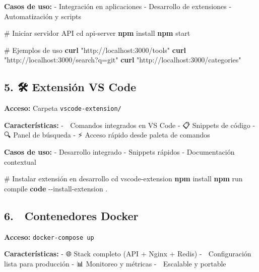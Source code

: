 \documentclass[
  11pt,
  letterpaper,
  oneside,
  openany]{scrbook}
\newenvironment{Shaded}{}{}
\newcommand{\AttributeTok}[1]{\textcolor[rgb]{0.84,0.23,0.29}{#1}}
\newcommand{\BuiltInTok}[1]{\textcolor[rgb]{0.84,0.23,0.29}{#1}}
\newcommand{\CommentTok}[1]{\textcolor[rgb]{0.42,0.45,0.49}{#1}}
\newcommand{\ExtensionTok}[1]{\textcolor[rgb]{0.84,0.23,0.29}{\textbf{#1}}}
\newcommand{\NormalTok}[1]{\textcolor[rgb]{0.14,0.16,0.18}{#1}}
\newcommand{\StringTok}[1]{\textcolor[rgb]{0.01,0.18,0.38}{#1}}
\begin{document}
\textbf{Casos de uso:} - Integración en aplicaciones - Desarrollo de
extensiones - Automatización y scripts

\begin{Shaded}
\begin{Highlighting}[]
\CommentTok{\# Iniciar servidor API}
\BuiltInTok{cd}\NormalTok{ api{-}server}
\ExtensionTok{npm}\NormalTok{ install}
\ExtensionTok{npm}\NormalTok{ start}

\CommentTok{\# Ejemplos de uso}
\ExtensionTok{curl} \StringTok{"http://localhost:3000/tools"}
\ExtensionTok{curl} \StringTok{"http://localhost:3000/search?q=git"}
\ExtensionTok{curl} \StringTok{"http://localhost:3000/categories"}
\end{Highlighting}
\end{Shaded}

\subsection{5. 🛠️ Extensión VS Code}\label{extensiuxf3n-vs-code}

\textbf{Acceso:} Carpeta \texttt{vscode-extension/}

\textbf{Características:} - 🎯 Comandos integrados en VS Code - 📋
Snippets de código - 🔍 Panel de búsqueda - ⚡ Acceso rápido desde
paleta de comandos

\textbf{Casos de uso:} - Desarrollo integrado - Snippets rápidos -
Documentación contextual

\begin{Shaded}
\begin{Highlighting}[]
\CommentTok{\# Instalar extensión en desarrollo}
\BuiltInTok{cd}\NormalTok{ vscode{-}extension}
\ExtensionTok{npm}\NormalTok{ install}
\ExtensionTok{npm}\NormalTok{ run compile}
\ExtensionTok{code} \AttributeTok{{-}{-}install{-}extension}\NormalTok{ .}
\end{Highlighting}
\end{Shaded}

\subsection{6. 🐳 Contenedores Docker}\label{contenedores-docker}

\textbf{Acceso:} \texttt{docker-compose\ up}

\textbf{Características:} - 🌐 Stack completo (API + Nginx + Redis) - 🔧
Configuración lista para producción - 📊 Monitoreo y métricas - 🚀
Escalable y portable
\end{document}
